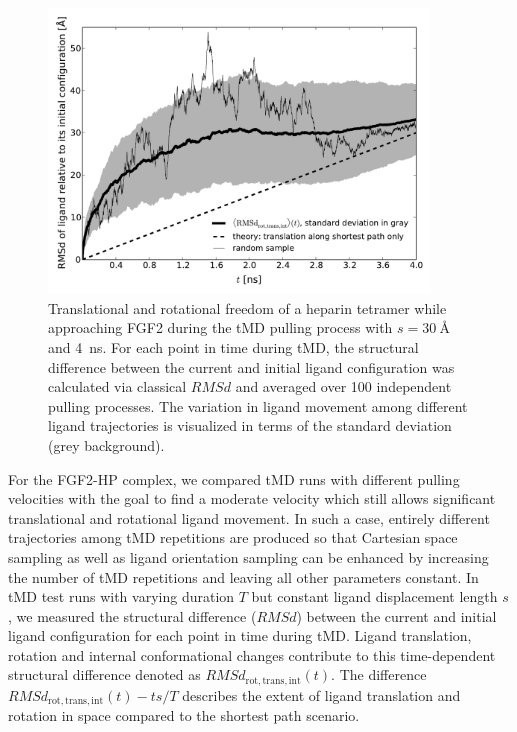 \begin{figure}
\centering
\includegraphics[width=0.9\textwidth]{gfx/dmd/figure_2_freedom_over_time_100samples_avg_stddev_randomone_pub_003.pdf}
\caption[]{
Translational and rotational freedom of a heparin tetramer while approaching
FGF2 during the tMD pulling process with $s=\SI{30}{\angstrom}$ and
\SI{4}{\nano\second}. For each point in time during tMD, the structural difference
between the current and initial ligand configuration was calculated via
classical $RMSd$ and averaged over 100 independent pulling processes. The
variation in ligand movement among different ligand trajectories is visualized
in terms of the standard deviation (grey background).
}
\label{fig:dmd:sampling}
\end{figure}



For the FGF2-HP complex, we compared tMD runs with different pulling velocities
with the goal to find a moderate velocity which still allows significant
translational and rotational ligand movement. In such a case, entirely different
trajectories among tMD repetitions are produced so that Cartesian space sampling
as well as ligand orientation sampling can be enhanced by increasing the number
of tMD repetitions and leaving all other parameters constant. In tMD test runs
with varying duration $T$ but constant ligand displacement length $s$, we
measured the structural difference ($RMSd$) between the current and initial
ligand configuration for each point in time during tMD. Ligand translation,
rotation and internal conformational changes contribute to this time-dependent
structural difference denoted as $RMSd_{\mathrm{rot,trans,int}}(t)$.  The
difference $RMSd_{\mathrm{rot,trans,int}}(t) - ts/T$ describes the extent of
ligand translation and rotation in space compared to the shortest path scenario.

